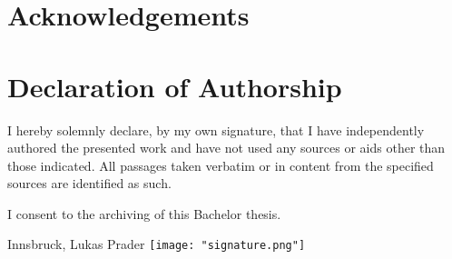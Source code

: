 \documentclass[a4paper,DIV=13,11pt,UKenglish,titlepage=firstiscover,abstract=on]{scrreprt}
\begin{document}
\chapter{Acknowledgements} \label{chap:acknowledgements}


\clearpage
\chapter*{Declaration of Authorship}

I hereby solemnly declare, by my own signature, that I have independently authored the presented work and have not used any sources or aids other than those indicated. All passages taken verbatim or in content from the specified sources are identified as such.

I consent to the archiving of this Bachelor thesis.

\hfill
\vspace{2cm} Innsbruck, \findate \hfill Lukas Prader \texttt{[image: "signature.png"]}


\newpage
\printbibliography[]

\end{document}
